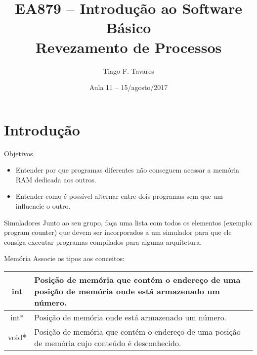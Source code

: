 \documentclass{beamer}
\title[11-contexto-e-preempcao]{EA879 -- Introdução ao Software
Básico\\Revezamento de Processos}
\author{Tiago F. Tavares}
\institute{FEEC -- UNICAMP}
\date{Aula 11 -- 15/agosto/2017}
\begin{document}
\begin{frame}
  \titlepage
\end{frame}


\section{Introdução}

\begin{frame}{Objetivos}
  \Large
  \begin{itemize}
    \item Entender por que programas diferentes não conseguem acessar a memória
      RAM dedicada aos outros.
    \item Entender como é possível alternar entre dois programas sem que um
      influencie o outro.
  \end{itemize}
\end{frame}


\begin{frame}[fragile]{Simuladores}
  \centering
  \Large
  Junto ao seu grupo, faça uma lista com todos os elementos (exemplo: program
  counter) que devem ser
  incorporados a um simulador para que ele consiga executar programas compilados
  para alguma arquitetura.
\end{frame}


\begin{frame}[fragile]{Memória}
  \centering
  \large
  Associe os tipos aos conceitos:
  \begin{tabular}{|c|p{5cm}|}  \hline
  int & Posição de memória que contém o endereço de uma posição de memória onde
    está armazenado um número. \\ \hline
  int* & Posição de memória onde está armazenado um número. \\ \hline
  void* & Posição de memória que contém o endereço de uma posição de memória
    cujo conteúdo é desconhecido. \\ \hline
  \end{tabular}
\end{frame}
\end{document}
